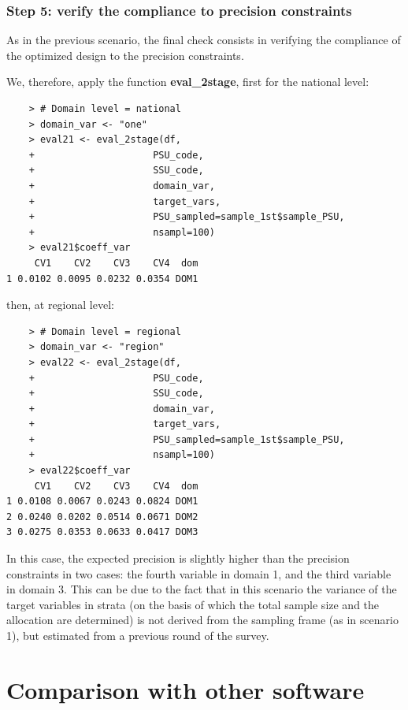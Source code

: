 \subsubsection{Step 5: verify the compliance to precision constraints}

As in the previous scenario, the final check consists in verifying the compliance of the optimized design to the precision constraints.

We, therefore, apply the function \textbf{eval\_2stage}, first for the national level:

\begin{verbatim}
	> # Domain level = national
	> domain_var <- "one"
	> eval21 <- eval_2stage(df,
	+                     PSU_code,
	+                     SSU_code,
	+                     domain_var,
	+                     target_vars,
	+                     PSU_sampled=sample_1st$sample_PSU,
	+                     nsampl=100) 
	> eval21$coeff_var
     CV1    CV2    CV3    CV4  dom
1 0.0102 0.0095 0.0232 0.0354 DOM1
\end{verbatim}
then, at regional level:

\begin{verbatim}
	> # Domain level = regional
	> domain_var <- "region"
	> eval22 <- eval_2stage(df,
	+                     PSU_code,
	+                     SSU_code,
	+                     domain_var,
	+                     target_vars,
	+                     PSU_sampled=sample_1st$sample_PSU,
	+                     nsampl=100) 
	> eval22$coeff_var
     CV1    CV2    CV3    CV4  dom
1 0.0108 0.0067 0.0243 0.0824 DOM1
2 0.0240 0.0202 0.0514 0.0671 DOM2
3 0.0275 0.0353 0.0633 0.0417 DOM3
\end{verbatim}

In this case, the expected precision is slightly higher than the precision constraints in two cases: the fourth variable in domain 1, and the third variable in domain 3. This can be due to the fact that in this scenario the variance of the target variables in strata (on the basis of which the total sample size and the allocation are determined) is not derived from the sampling frame (as in scenario 1), but estimated from a previous round of the survey. 

\section{Comparison with other software}

